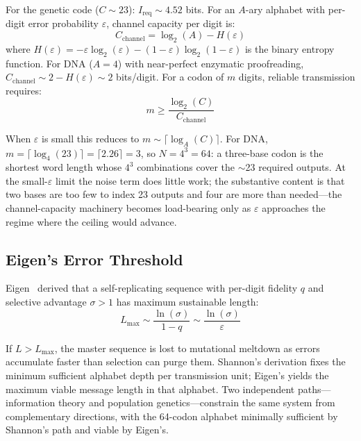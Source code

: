 \documentclass[11pt]{article}
\begin{document}
For the genetic code ($C \sim 23$): $I_{\mathrm{req}} \sim 4.52$ bits. For an $A$-ary alphabet with per-digit error probability $\varepsilon$, channel capacity per digit is:
\begin{equation}
    C_{\mathrm{channel}} = \log_2(A) - H(\varepsilon)
\end{equation}
where $H(\varepsilon) = -\varepsilon \log_2(\varepsilon) - (1 - \varepsilon) \log_2(1 - \varepsilon)$ is the binary entropy function. For DNA ($A = 4$) with near-perfect enzymatic proofreading, $C_{\mathrm{channel}} \sim 2 - H(\varepsilon) \sim 2$ bits/digit. For a codon of $m$ digits, reliable transmission requires:
\begin{equation}
    m \geq \frac{\log_2(C)}{C_{\mathrm{channel}}}
\end{equation}

When $\varepsilon$ is small this reduces to $m \sim \lceil \log_A(C) \rceil$. For DNA, $m = \lceil \log_4(23) \rceil = \lceil 2.26 \rceil = 3$, so $N = 4^3 = 64$: a three-base codon is the shortest word length whose $4^3$ combinations cover the $\sim$23 required outputs. At the small-$\varepsilon$ limit the noise term does little work; the substantive content is that two bases are too few to index 23 outputs and four are more than needed---the channel-capacity machinery becomes load-bearing only as $\varepsilon$ approaches the regime where the ceiling would advance.

\subsection{Eigen's Error Threshold}

Eigen~\cite{eigen1971} derived that a self-replicating sequence with per-digit fidelity $q$ and selective advantage $\sigma > 1$ has maximum sustainable length:
\begin{equation}
    L_{\max} \sim \frac{\ln(\sigma)}{1 - q} \sim \frac{\ln(\sigma)}{\varepsilon}
\end{equation}

If $L > L_{\max}$, the master sequence is lost to mutational meltdown as errors accumulate faster than selection can purge them. Shannon's derivation fixes the minimum sufficient alphabet depth per transmission unit; Eigen's yields the maximum viable message length in that alphabet. Two independent paths---information theory and population genetics---constrain the same system from complementary directions, with the 64-codon alphabet minimally sufficient by Shannon's path and viable by Eigen's.
\end{document}
